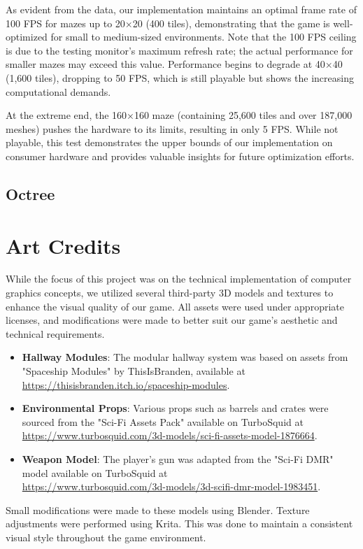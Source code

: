 \documentclass{article}
\begin{document}
As evident from the data, our implementation maintains an optimal frame rate of 100 FPS for mazes up to 20×20 (400 tiles), demonstrating that the game is well-optimized for small to medium-sized environments. Note that the 100 FPS ceiling is due to the testing monitor's maximum refresh rate; the actual performance for smaller mazes may exceed this value. Performance begins to degrade at 40×40 (1,600 tiles), dropping to 50 FPS, which is still playable but shows the increasing computational demands.

At the extreme end, the 160×160 maze (containing 25,600 tiles and over 187,000 meshes) pushes the hardware to its limits, resulting in only 5 FPS. While not playable, this test demonstrates the upper bounds of our implementation on consumer hardware and provides valuable insights for future optimization efforts.

\subsection{Octree}

\pagebreak
\section{Art Credits}
While the focus of this project was on the technical implementation of computer graphics concepts, we utilized several third-party 3D models and textures to enhance the visual quality of our game. All assets were used under appropriate licenses, and modifications were made to better suit our game's aesthetic and technical requirements.

\begin{itemize}
    \item \textbf{Hallway Modules}: The modular hallway system was based on assets from "Spaceship Modules" by ThisIsBranden, available at \url{https://thisisbranden.itch.io/spaceship-modules}.
    
    \item \textbf{Environmental Props}: Various props such as barrels and crates were sourced from the "Sci-Fi Assets Pack" available on TurboSquid at \url{https://www.turbosquid.com/3d-models/sci-fi-assets-model-1876664}.
    
    \item \textbf{Weapon Model}: The player's gun was adapted from the "Sci-Fi DMR" model available on TurboSquid at\\\url{https://www.turbosquid.com/3d-models/3d-scifi-dmr-model-1983451}.
\end{itemize}

Small modifications were made to these models using Blender. Texture adjustments were performed using Krita. This was done to maintain a consistent visual style throughout the game environment.

% 
% 
\end{document}
